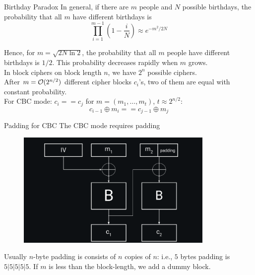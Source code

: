 \documentclass[usenames,dvipsnames, 9pt]{beamer}
\begin{document}
\begin{frame}{Birthday Paradox}
\Large
In general, if there are $m$ people and $N$ possible birthdays, the probability that all $m$ have different birthdays is
\[
	\prod_{i=1}^{m-1} \left(  1  -\frac{i}{N} \right) \approx e^{-m^2/2N}
\]

Hence, for $m = \sqrt{2N \ln 2}$, the probability that all $m$ people have different birthdays is $1/2$.  This probability decreases rapidly when $m$ grows. \\[10pt]

\pause
In block ciphers on block length $n$, we have $2^{n}$ possible ciphers.\\
After $m = \mathcal{O}(2^{n/2})$ different cipher blocks $c_i$'s, two of them are equal with constant probability.\\
\pause
For CBC mode: $c_i == c_j$ for $m=(m_1, \ldots, m_t)$, $t \approx 2^{n/2}$:
\Large
\[
c_{i-1} \oplus m_{i} == c_{j-1} \oplus m_{j}
\]

\end{frame}


\begin{frame}{Padding for CBC}
\Large
The CBC mode requires padding
\begin{figure}
	\includegraphics[width=0.85\textwidth]{CBC_Padding}
\end{figure}
Usually $n$-byte padding is consists of $n$ copies of $n$: i.e., $5$ bytes padding is $5|5|5|5|5$. If $m$ is less than the block-length, we add a dummy block.
\end{frame}
\end{document}
